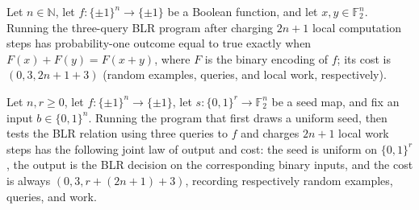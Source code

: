 \begin{theorem}
\label{FABL.runWithCost_derandomizedBLRTickQueryProgram}
\leanok
{}
Let $n\in\mathbb{N}$, let $f:\{\pm1\}^n\to\{\pm1\}$ be a Boolean function, and let
$x,y\in\mathbb{F}_2^n$. Running the three-query BLR program after charging $2n+1$ local
computation steps has probability-one outcome equal to true exactly when
$F(x)+F(y)=F(x+y)$, where $F$ is the binary encoding of $f$; its cost is $(0,3,2n+1+3)$
(random examples, queries, and local work, respectively).
\end{theorem}

\begin{theorem}
\label{FABL.runWithCost_derandomizedBLRAfterInputProgram}
\leanok
{}
Let $n,r\ge0$, let $f:\{\pm1\}^n\to\{\pm1\}$, let $s:\{0,1\}^r\to\mathbb F_2^n$ be a
seed map, and fix an input $b\in\{0,1\}^n$. Running the program that first draws a
uniform seed, then tests the BLR relation using three queries to $f$ and charges $2n+1$
local work steps has the following joint law of output and cost: the seed is uniform on
$\{0,1\}^r$, the output is the BLR decision on the corresponding binary inputs, and the
cost is always $(0,3,r+(2n+1)+3)$, recording respectively random examples, queries, and
work.
\end{theorem}


